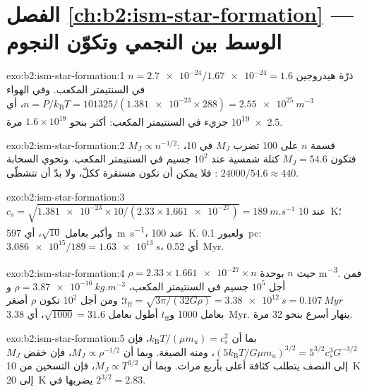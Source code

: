 \section*{الفصل \ref{ch:b2:ism-star-formation} --- الوسط بين النجمي وتكوّن النجوم}

\begin{solution}{exo:b2:ism-star-formation:1}
$n = \num{2.7e-24}/\num{1.67e-24} = 1.6$ ذرّة هيدروجين في السنتيمتر المكعب. وفي الهواء
$n = P/k_{\mathrm B}T = 101325/(\num{1.381e-23}\times288) = \qty{2.55e25}{m^{-3}}$،
أي \num{2.5e19} جزيء في السنتيمتر المكعب: أكثر بنحو $1.6\times10^{19}$
مرة.
\end{solution}

\begin{solution}{exo:b2:ism-star-formation:2}
$M_J \propto n^{-1/2}$: قسمة $n$ على 100 تضرب $M_J$ في 10، فتكون
$M_J = 54.6$ كتلة شمسية عند $10^2$ جسيم في السنتيمتر المكعب. وتحوي السحابة
$\num{24000}/54.6 \approx 440$ : فلا يمكن أن تكون مستقرة ككلّ، ولا بدّ أن
تتشظّى.
\end{solution}

\begin{solution}{exo:b2:ism-star-formation:3}
$c_s = \sqrt{\num{1.381e-23}\times10/(2.33\times\num{1.661e-27})} =
\qty{189}{m.s^{-1}}$ عند \qty{10}{K}؛ وأكبر بعامل $\sqrt{10}$، أي \qty{597}{m.s^{-1}}،
عند \qty{100}{K}. ولعبور \qty{0.1}{pc}: $\num{3.086e15}/189 = \qty{1.63e13}{s}$،
أي \qty{0.52}{Myr}.
\end{solution}

\begin{solution}{exo:b2:ism-star-formation:4}
$\rho = 2.33\times\num{1.661e-27}\times n$ حيث $n$ بوحدة \unit{m^{-3}}. فمن أجل $10^5$
جسيم في السنتيمتر المكعب، $\rho = \qty{3.87e-16}{kg.m^{-3}}$
و$t_{\mathrm{ff}} = \sqrt{3\pi/(32G\rho)} = \qty{3.38e12}{s} = \qty{0.107}{Myr}$؛ ومن أجل
$10^2$ تكون $\rho$ أصغر بعامل \num{1000} و$t_{\mathrm{ff}}$ أطول بعامل $\sqrt{1000} = 31.6$،
 أي \qty{3.38}{Myr}.  ينهار أسرع بنحو 32 مرة.
\end{solution}

\begin{solution}{exo:b2:ism-star-formation:5}
بما أن $k_{\mathrm B}T/(\mu m_u) = c_s^2$، فإن $(5k_{\mathrm B}T/G\mu m_u)^{3/2} =
5^{3/2}c_s^3G^{-3/2}$، ومنه الصيغة. وبما أن $M_J \propto \rho^{-1/2}$،
فإن خفض $M_J$ إلى النصف يتطلب كثافة أعلى بأربع مرات. وبما أن $M_J \propto T^{3/2}$،
فإن التسخين من \qty{10}{K} إلى \qty{20}{K} يضربها في $2^{3/2} = 2.83$.
\end{solution}

